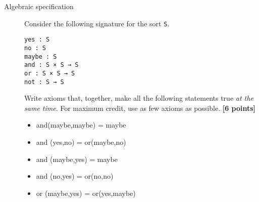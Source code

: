 \documentclass{article}
\begin{document}
\begin{description}
\item[Algebraic specification]

Consider the following signature for the sort \verb!S!.

\begin{verbatim}
yes : S
no : S
maybe : S
and : S × S → S
or : S × S → S
not : S → S
\end{verbatim}

Write axioms that, together, make all the following statements true
\emph{at the same time}. For maximum credit, use as few axioms as
possible. \hfill{\textbf{[6 points]}}

\begin{itemize}
\item
  and(maybe,maybe) = maybe
\item
  and (yes,no) = or(maybe,no)
\item
  and (maybe,yes) = maybe
\item
  and (no,yes) = or(no,no)
\item
  or (maybe,yes) = or(yes,maybe)
\end{itemize}
\end{description}


\newpage
\end{document}
